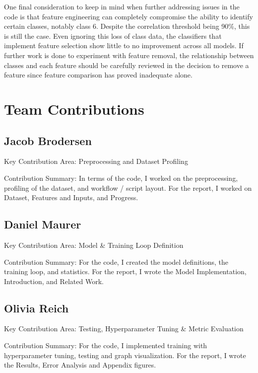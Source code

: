 \documentclass[11pt]{article}
\begin{document}
One final consideration to keep in mind when further addressing issues in the code is that feature engineering can completely compromise the ability to identify certain classes, notably class 6. Despite the correlation threshold being 90\%, this is still the case. Even ignoring this loss of class data, the classifiers that implement feature selection show little to no improvement across all models. If further work is done to experiment with feature removal, the relationship between classes and each feature should be carefully reviewed in the decision to remove a feature since feature comparison has proved inadequate alone.

\section*{Team Contributions}

\subsection{Jacob Brodersen}

Key Contribution Area: Preprocessing and Dataset Profiling

Contribution Summary: In terms of the code, I worked on the preprocessing, profiling of the dataset, and workflow / script layout. For the report, I worked on Dataset, Features and Inputs, and Progress.

\subsection{Daniel Maurer}

Key Contribution Area: Model \& Training Loop Definition 

Contribution Summary: For the code, I created the model definitions, the training loop, and statistics. For the report, I wrote the Model Implementation, Introduction, and Related Work.

\subsection{Olivia Reich}

Key Contribution Area: Testing, Hyperparameter Tuning \& Metric Evaluation

Contribution Summary: For the code, I implemented training with hyperparameter tuning, testing and graph visualization. For the report, I wrote the Results,  Error Analysis and Appendix figures.
\end{document}
